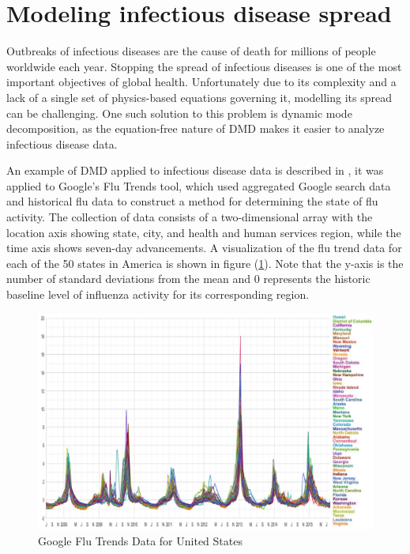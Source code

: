 \documentclass[12pt]{report}
\begin{document}
\section{Modeling infectious disease spread}
Outbreaks of infectious diseases are the cause of death for millions of people worldwide each year. Stopping the spread of infectious diseases is one of the most important objectives of global health. Unfortunately due to its complexity and a lack of a single set of physics-based equations governing it, modelling its spread can be challenging. One such solution to this problem is dynamic mode decomposition, as the equation-free nature of DMD makes it easier to analyze infectious disease data. 

An example of DMD applied to infectious disease data is described in \cite{Epidemiology}, it was applied to Google’s Flu Trends tool, which used aggregated Google search data and historical flu data to construct a method for determining the state of flu activity. The collection of data consists of a two-dimensional array with the location axis showing state, city, and health and human services region, while the time axis shows seven-day advancements. A visualization of the flu trend data for each of the 50 states in America is shown in figure (\ref{fig:GFTData}). Note that the y-axis is the number of standard deviations from the mean and 0 represents the historic baseline level of influenza activity for its corresponding region. 

\begin{figure}[H]
    \centering
    \includegraphics[width=1.1\textwidth]{Application pics/GFT.png}
    \caption{Google Flu Trends Data for United States \cite{GFT}} \label{fig:GFTData}
\end{figure}
\noindent
\end{document}
